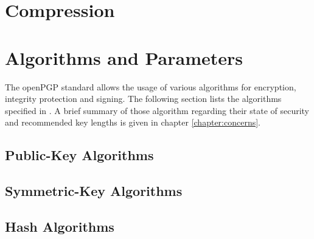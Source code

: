 \section{Compression}

\section{Algorithms and Parameters}



The openPGP standard allows the usage of various algorithms for encryption, integrity protection and signing. The following section lists the algorithms specified in \citep[section 9]{RFC4880}. A brief summary of those algorithm regarding their state of security and recommended key lengths is given in chapter \ref{chapter:concerns}.

\subsection{Public-Key Algorithms}

\subsection{Symmetric-Key Algorithms}

\subsection{Hash Algorithms}

